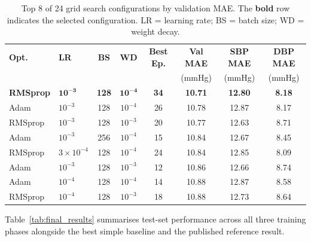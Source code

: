 \begin{table}[htbp]
  \centering
  \caption{%
    Top 8 of 24 grid search configurations by validation MAE.
    The \textbf{bold} row indicates the selected configuration.
    LR = learning rate; BS = batch size; WD = weight decay.}
  \label{tab:gridsearch}
  \small
  \begin{tabular}{llcccccc}
    \toprule
    \textbf{Opt.} & \textbf{LR} & \textbf{BS} & \textbf{WD}
      & \textbf{Best Ep.} & \textbf{Val MAE}
      & \textbf{SBP MAE} & \textbf{DBP MAE} \\
    & & & & & (mmHg) & (mmHg) & (mmHg) \\
    \midrule
    \textbf{RMSprop} & $\mathbf{10^{-3}}$ & \textbf{128} & $\mathbf{10^{-4}}$
      & \textbf{34} & \textbf{10.71} & \textbf{12.80} & \textbf{8.18} \\
    Adam    & $10^{-3}$ & 128 & $10^{-4}$ & 26 & 10.78 & 12.87 & 8.17 \\
    RMSprop & $10^{-3}$ & 128 & $10^{-3}$ & 20 & 10.77 & 12.63 & 8.71 \\
    Adam    & $10^{-3}$ & 256 & $10^{-4}$ & 15 & 10.84 & 12.67 & 8.45 \\
    RMSprop & $3{\times}10^{-4}$ & 128 & $10^{-4}$ & 24 & 10.84 & 12.85 & 8.09 \\
    Adam    & $10^{-3}$ & 128 & $10^{-3}$ & 12 & 10.86 & 12.66 & 8.74 \\
    Adam    & $10^{-4}$ & 128 & $10^{-4}$ & 14 & 10.88 & 12.87 & 8.58 \\
    RMSprop & $10^{-4}$ & 128 & $10^{-3}$ & 18 & 10.88 & 12.73 & 8.64 \\
    \bottomrule
  \end{tabular}
\end{table}

\noindent Table~\ref{tab:final_results} summarises test-set performance across all three training phases
alongside the best simple baseline and the published reference result.

